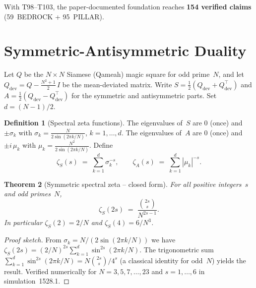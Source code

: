 \documentclass[aps,prd,twocolumn,superscriptaddress,floatfix,nofootinbib]{revtex4-2}
\newtheorem{theorem}{Theorem}
\theoremstyle{definition}
\newtheorem{definition}[theorem]{Definition}
\theoremstyle{remark}
\begin{document}
\noindent
With T98--T103, the paper-documented foundation reaches
\textbf{154 verified claims} (59~BEDROCK + 95~PILLAR).


\section{Symmetric-Antisymmetric Duality}\label{sec:SA-duality}

Let $Q$ be the $N\times N$ Siamese (Qameah) magic square for odd prime~$N$,
and let $Q_{\mathrm{dev}} = Q - \frac{N^2+1}{2}\,I$ be the mean-deviated matrix.
Write $S = \tfrac12(Q_{\mathrm{dev}} + Q_{\mathrm{dev}}^{\!\top})$ and
$A = \tfrac12(Q_{\mathrm{dev}} - Q_{\mathrm{dev}}^{\!\top})$ for the
symmetric and antisymmetric parts.  Set $d = (N-1)/2$.

\begin{definition}[Spectral zeta functions]\label{def:spectral-zeta}
The eigenvalues of~$S$ are $0$ (once) and $\pm\sigma_k$ with
$\sigma_k = \frac{N}{2\sin(2\pi k/N)}$, $k = 1,\dots,d$.
The eigenvalues of~$A$ are $0$ (once) and $\pm i\,\mu_k$ with
$\mu_k = \frac{N^2}{2\sin(2\pi k/N)}$.
Define
\[
  \zeta_S(s) \;=\; \sum_{k=1}^{d} \sigma_k^{-s},\qquad
  \zeta_A(s) \;=\; \sum_{k=1}^{d} |\mu_k|^{-s}.
\]
\end{definition}

\begin{theorem}[Symmetric spectral zeta -- closed form]%
  \label{thm:zeta-S-closed}
For all positive integers~$s$ and odd primes~$N$,
\[
  \zeta_S(2s) \;=\; \frac{\binom{2s}{s}}{N^{2s-1}}.
\]
In particular $\zeta_S(2) = 2/N$ and
$\zeta_S(4) = 6/N^3$.
\end{theorem}

\begin{proof}[Proof sketch]
From $\sigma_k = N/(2\sin(2\pi k/N))$ we have
$\zeta_S(2s) = (2/N)^{2s}\sum_{k=1}^{d}\sin^{2s}(2\pi k/N)$.
The trigonometric sum $\sum_{k=1}^{d}\sin^{2s}(2\pi k/N)
= N\binom{2s}{s}/4^s$ (a classical identity for odd~$N$)
yields the result.
Verified numerically for $N = 3,5,7,\ldots,23$ and
$s = 1,\ldots,6$ in simulation~1528.1.
\end{proof}
\end{document}
